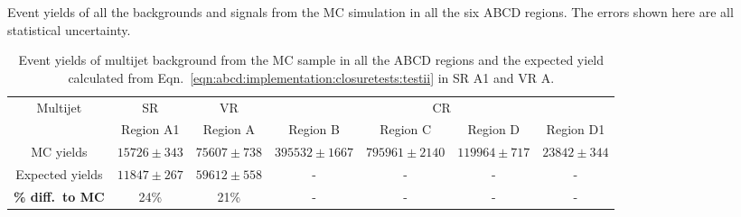 \begin{table}
		\caption{Event yields of all the backgrounds and signals from the MC simulation in all the six ABCD regions. The errors shown here are all statistical uncertainty.}
		\label{table:abcd:implementation:closuretests:testi}
		\vspace{1cm}
		\centering
		\begin{tabular}{ c | c | c | c | c | c | c } 
			\toprule
			Multijet & SR & VR & \multicolumn{4}{c}{CR} \\ \cline{2-7}
			& Region A1 & Region A & Region B & Region C & Region D & Region D1 \\
			\midrule
			MC yields & $\num{15726}\pm\num{343}$ & $\num{75607}\pm\num{738}$ & $\num{395532}\pm\num{1667}$ & $\num{795961}\pm\num{2140}$ & $\num{119964}\pm\num{717}$ & $\num{23842}\pm\num{344}$ \\
			Expected yields & $\num{11847}\pm\num{267}$ & $\num{59612}\pm\num{558}$ & - & - & - & - \\
			\midrule
			\textbf{\% diff.\ to MC} & 24\% & 21\% & - & - & - & - \\
			\bottomrule
		\end{tabular}
		\caption{Event yields of multijet background from the MC sample in all the ABCD regions and the expected yield calculated from Eqn.\ \ref{eqn:abcd:implementation:closuretests:testii} in SR A1 and VR A.}
		\label{table:abcd:implementation:closuretests:testii}
\end{table}


